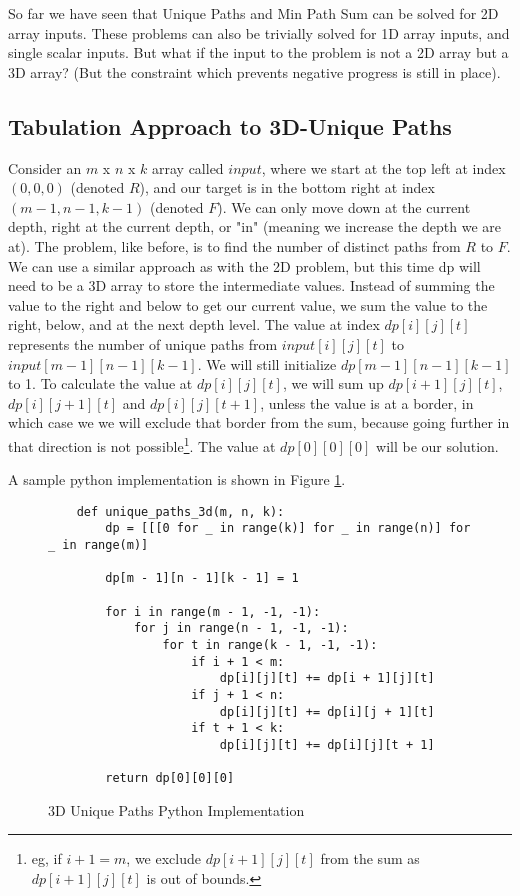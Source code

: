 So far we have seen that Unique Paths and Min Path Sum can be solved for 2D array inputs.
These problems can also be trivially solved for 1D array inputs, and single scalar inputs.
But what if the input to the problem is not a 2D array but a 3D array? (But the constraint which prevents negative progress is still in place).

\subsection{Tabulation Approach to 3D-Unique Paths}
Consider an $m$ x $n$ x $k$ array called $input$, where we start at the top left at index $(0,0,0)$ (denoted $R$), and our target is in the bottom right at index $(m-1, n-1, k-1)$ (denoted $F$).
We can only move down at the current depth, right at the current depth, or "in" (meaning we increase the depth we are at).
The problem, like before, is to find the number of distinct paths from $R$ to $F$.
We can use a similar approach as with the 2D problem, but this time dp will need to be a 3D array to store the intermediate values.
Instead of summing the value to the right and below to get our current value, we sum the value to the right, below, and at the next depth level.
The value at index $dp[i][j][t]$ represents the number of unique paths from $input[i][j][t]$ to $input[m-1][n-1][k-1]$.
We will still initialize $dp[m-1][n-1][k-1]$ to 1.
To calculate the value at $dp[i][j][t]$, we will sum up $dp[i+1][j][t]$, $dp[i][j+1][t]$ and $dp[i][j][t+1]$, unless the value is at a border,
in which case we we will exclude that border from the sum, because going further in that direction is not possible\footnote{eg, if $i+1 = m$, we exclude $dp[i+1][j][t]$ from the sum as $dp[i+1][j][t]$ is out of bounds.}.
The value at $dp[0][0][0]$ will be our solution.

A sample python implementation is shown in Figure \ref{fig:3d-unique-paths}.

\begin{figure}[H]
    \centering
    \begin{lstlisting}
    def unique_paths_3d(m, n, k):
        dp = [[[0 for _ in range(k)] for _ in range(n)] for _ in range(m)]

        dp[m - 1][n - 1][k - 1] = 1

        for i in range(m - 1, -1, -1):
            for j in range(n - 1, -1, -1):
                for t in range(k - 1, -1, -1):
                    if i + 1 < m:
                        dp[i][j][t] += dp[i + 1][j][t]
                    if j + 1 < n:
                        dp[i][j][t] += dp[i][j + 1][t]
                    if t + 1 < k:
                        dp[i][j][t] += dp[i][j][t + 1]

        return dp[0][0][0]
    \end{lstlisting}
    \caption{3D Unique Paths Python Implementation}
    \label{fig:3d-unique-paths}
\end{figure}
